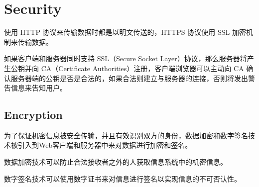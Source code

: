 \begin{lstlisting}[language=bash]

\end{lstlisting}




\begin{lstlisting}[language=bash]

\end{lstlisting}





\begin{lstlisting}[language=bash]

\end{lstlisting}




\begin{lstlisting}[language=bash]

\end{lstlisting}





\section{Security}



使用 HTTP 协议来传输数据时都是以明文传送的，HTTPS 协议使用 SSL 加密机制来传输数据。



如果客户端和服务器同时支持 SSL（Secure Socket Layer）协议，那么服务器将产生公钥并向 CA（Certificate Authorities）注册，客户端浏览器可以主动向 CA 确认服务器端的公钥是否是合法的，如果合法则建立与服务器的连接，否则将发出警告信息来告知用户。

\subsection{Encryption}

为了保证机密信息被安全传输，并且有效识别双方的身份，数据加密和数字签名技术被引入到Web客户端和服务器中来对数据进行加密和签名。

\begin{compactitem}
\item 数据加密技术可以防止合法接收者之外的人获取信息系统中的机密信息。

\item 数字签名技术可以使用数字证书来对信息进行签名以实现信息的不可否认性。
\end{compactitem}

